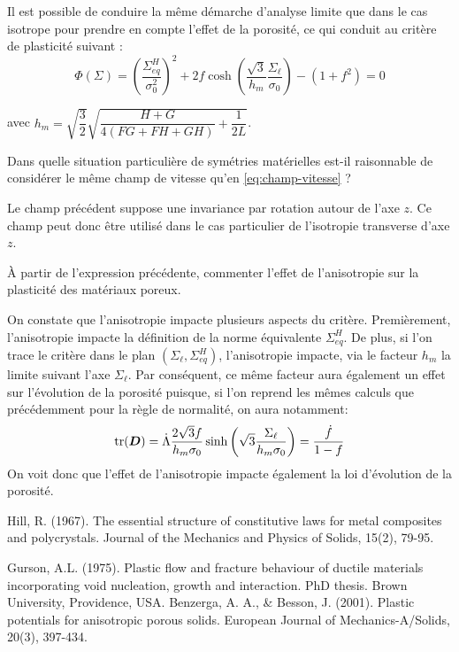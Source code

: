 \documentclass[french,english,12pt]{exam}
\begin{document}
\begin{questions}
Il est possible de conduire la même démarche d'analyse limite que dans le cas isotrope pour prendre en compte l'effet de la porosité, ce qui conduit au critère de plasticité suivant \cite{benzerga}:
  \begin{equation}
   \Phi\left( \Sigma     \right)  = \left(  \frac{\Sigma_{eq}^H}{\sigma_0^2} \right)^2 + 2f \cosh{\left(  \frac{\sqrt{3}}{h_m} \frac{\Sigma_\ell}{\sigma_0} \right)} - (1 + f^2) = 0
\label{eq5}
  \end{equation} 

avec $h_m = \sqrt{\dfrac{3}{2}}\sqrt{\dfrac{H+G}{4(FG+FH+GH)} + \dfrac{1}{2L}}$.

\question Dans quelle situation particulière de symétries matérielles est-il raisonnable de considérer le même champ de vitesse qu'en \eqref{eq:champ-vitesse} ?
\begin{solution}
Le champ précédent suppose une invariance par rotation autour de l'axe $z$. Ce champ peut donc être utilisé dans le cas particulier de l'isotropie transverse d'axe $z$.
\end{solution}
    \question \`A partir de l'expression précédente, commenter l'effet de l'anisotropie sur la plasticité des matériaux poreux.
\begin{solution}
On constate que l'anisotropie impacte plusieurs aspects du critère. Premièrement, l'anisotropie impacte la définition de la norme équivalente $\Sigma_{eq}^H$. De plus, si l'on trace le critère dans le plan $(\Sigma_\ell,\Sigma_{eq}^H)$, l'anisotropie impacte, via le facteur $h_m$ la limite suivant l'axe $\Sigma_\ell$. Par conséquent, ce même facteur aura également un effet sur l'évolution de la porosité puisque, si l'on reprend les mêmes calculs que précédemment pour la règle de normalité, on aura notamment:
$$\mathrm{tr}(\boldsymbol{D}) = \dot{\Lambda}\dfrac{2\sqrt{3}f}{h_m\sigma_0} \sinh{\left(  \sqrt{3} \frac{\Sigma_\ell}{h_m\sigma_0} \right)} = \dfrac{\dot{f}}{1-f}$$
On voit donc que l'effet de l'anisotropie impacte également la loi d'évolution de la porosité.
\end{solution}
\end{questions}

\begin{thebibliography}{9}
Hill, R. (1967). The essential structure of constitutive laws for metal composites and polycrystals. Journal of the Mechanics and Physics of Solids, 15(2), 79-95.

Gurson, A.L. (1975). Plastic flow and fracture behaviour of ductile materials incorporating void nucleation, growth and interaction. PhD thesis. Brown University, Providence, USA.
Benzerga, A. A.,   \& Besson, J. (2001). Plastic potentials for anisotropic porous solids. European Journal of Mechanics-A/Solids, 20(3), 397-434.


\end{thebibliography}
\end{document}
